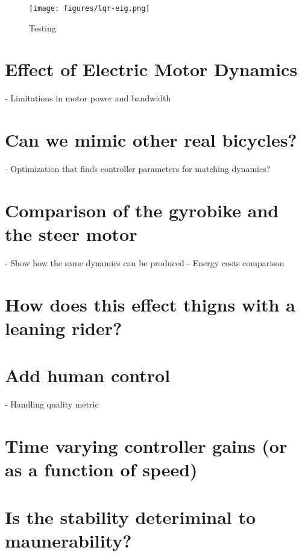 \documentclass[12pt]{article}
\begin{document}
\begin{figure}
  \centering
  \texttt{[image: figures/lqr-eig.png]}
  \caption{Testing}
  \label{fig:lqr-eig}
\end{figure}

\section{Effect of Electric Motor Dynamics}

- Limitations in motor power and bandwidth

\section{Can we mimic other real bicycles?}

- Optimization that finds controller parameters for matching dynamics?

\section{Comparison of the gyrobike and the steer motor}

- Show how the same dynamics can be produced
- Energy costs comparison

\section{How does this effect thigns with a leaning rider?}

\section{Add human control}

- Handling quality metric

\section{Time varying controller gains (or as a function of speed)}

\section{Is the stability deteriminal to maunerability?}
\end{document}
